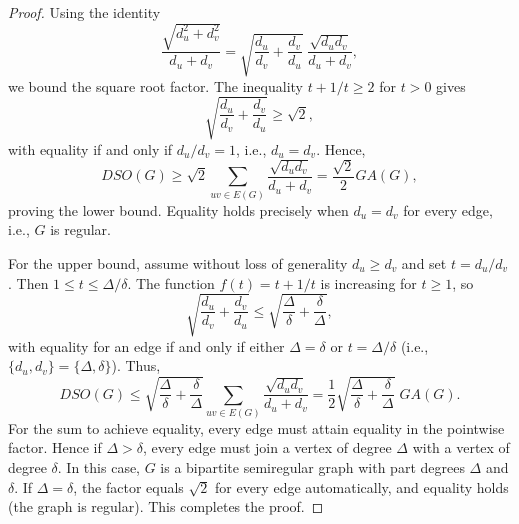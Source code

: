 \documentclass{article}
\theoremstyle{definition}
\begin{document}
\begin{proof}
Using the identity
\[
\frac{\sqrt{d_u^2+d_v^2}}{d_u+d_v} = \sqrt{\frac{d_u}{d_v}+\frac{d_v}{d_u}}\;\frac{\sqrt{d_u d_v}}{d_u+d_v},
\]
we bound the square root factor. The inequality $t+1/t \ge 2$ for $t>0$ gives
\[
\sqrt{\frac{d_u}{d_v}+\frac{d_v}{d_u}} \ge \sqrt{2},
\]
with equality if and only if $d_u/d_v = 1$, i.e., $d_u=d_v$. Hence,
\[
DSO(G) \ge \sqrt{2} \sum_{uv\in E(G)} \frac{\sqrt{d_u d_v}}{d_u+d_v}
= \frac{\sqrt{2}}{2} GA(G),
\]
proving the lower bound. Equality holds precisely when $d_u=d_v$ for every edge, i.e., $G$ is regular.

For the upper bound, assume without loss of generality $d_u \ge d_v$ and set $t = d_u/d_v$. Then $1\le t \le \Delta/\delta$. The function $f(t)=t+1/t$ is increasing for $t\ge 1$, so
\[
\sqrt{\frac{d_u}{d_v}+\frac{d_v}{d_u}} \le \sqrt{\frac{\Delta}{\delta}+\frac{\delta}{\Delta}},
\]
with equality for an edge if and only if either $\Delta=\delta$ or $t = \Delta/\delta$ (i.e., $\{d_u,d_v\} = \{\Delta,\delta\}$).  
Thus,
\[
DSO(G) \le \sqrt{\frac{\Delta}{\delta}+\frac{\delta}{\Delta}} \sum_{uv\in E(G)} \frac{\sqrt{d_u d_v}}{d_u+d_v}
= \frac{1}{2}\sqrt{\frac{\Delta}{\delta}+\frac{\delta}{\Delta}}\; GA(G).
\]
For the sum to achieve equality, every edge must attain equality in the pointwise factor. Hence if $\Delta>\delta$, every edge must join a vertex of degree $\Delta$ with a vertex of degree $\delta$. 
In this case, $G$ is a bipartite semiregular graph with part degrees $\Delta$ and $\delta$.
If $\Delta=\delta$, the factor equals $\sqrt{2}$ for every edge automatically, and equality holds (the graph is regular). This completes the proof.
\end{proof}
\end{document}
